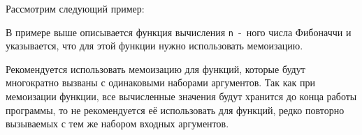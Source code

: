     Рассмотрим следующий пример:

    

    В примере выше описывается функция вычисления \verb,n,~-~ного числа Фибоначчи и указывается, что для этой функции нужно использовать мемоизацию.

    Рекомендуется использовать мемоизацию для функций, которые будут многократно вызваны с одинаковыми наборами аргументов.
    Так как при мемоизации функции, все вычисленные значения будут хранится до конца работы программы, то не рекомендуется её использовать для функций, редко повторно вызываемых с тем же набором входных аргументов.
